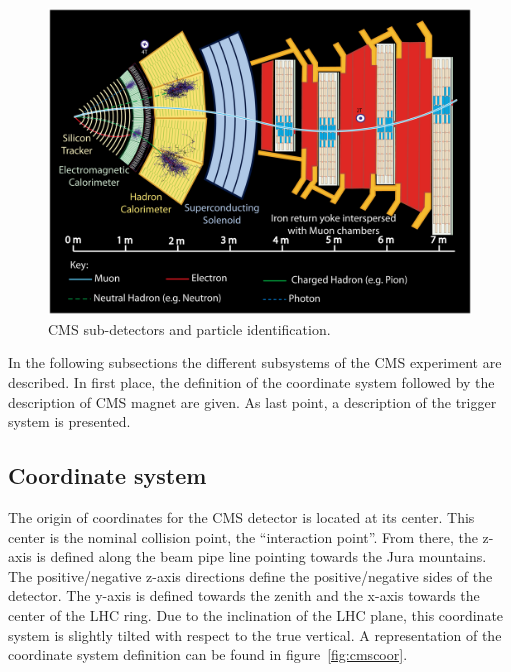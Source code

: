 \begin{figure}[!Hhtbp]
  \begin{center}
    \includegraphics[width=\textwidth]{figs/PictureforPoint5_oct04_allp.jpg}
    \caption{CMS sub-detectors and particle identification. }
    \label{fig:cmsslice}
  \end{center}
\end{figure}

In the following subsections the different subsystems of the CMS experiment are described. In first place, the definition of the coordinate system followed by the description of CMS magnet are given. As last point, a description of the trigger system is presented. 

\subsection{Coordinate system}
\label{sec:Csys}

The origin of coordinates for the CMS detector is located at its center. This center is the nominal collision point, the ``interaction point''. From there, the z-axis is defined along the beam pipe line pointing towards the Jura mountains. The positive/negative z-axis directions define the positive/negative sides of the detector. The y-axis is defined towards the zenith and the x-axis towards the center of the LHC ring. Due to the inclination of the LHC plane, this coordinate system is slightly tilted with respect to the true vertical. A representation of the coordinate system definition can be found in figure~\ref{fig:cmscoor}. 

